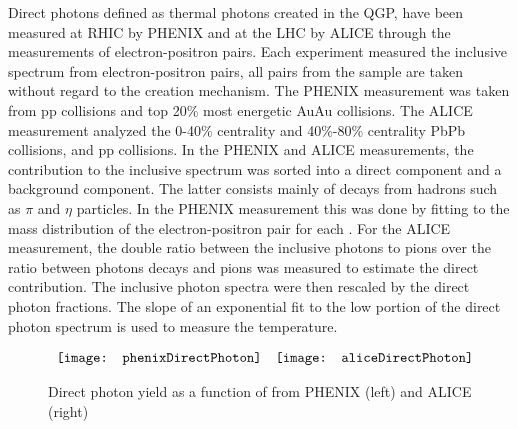     Direct photons defined as thermal photons created in the QGP, have been 
      measured at RHIC by PHENIX \cite{phenixPhoton2010} and at the LHC by ALICE 
      \cite{photonALICE} through the measurements of electron-positron pairs.
    Each experiment measured the inclusive \pt{} spectrum from 
      electron-positron pairs, all pairs from the sample are taken without
      regard to the creation mechanism.
    The PHENIX measurement was taken from pp collisions and top 20\% most 
      energetic AuAu collisions\DIFdelbegin {}\DIFdelend . 
    The ALICE measurement analyzed the 0-40\% centrality and 40\%-80\% centrality
      PbPb collisions, and pp collisions. 
    In the PHENIX and ALICE measurements, the contribution to the inclusive 
      spectrum was sorted into a direct component and a background component.
    The latter consists mainly of decays from hadrons such as $\pi$ and $\eta$
      particles. 
    In the PHENIX measurement this was done by fitting to the mass 
      distribution of the electron-positron pair for each \pt{} \DIFaddbegin {}\DIFaddend .
    For the ALICE measurement, the double ratio between the inclusive photons 
      to pions over the ratio between photons \DIFdelbegin {}\DIFdelend \DIFaddbegin {}\DIFaddend decays and pions 
      was measured to estimate the direct contribution.
    \DIFaddbegin {}\DIFaddend The inclusive photon \pt{} spectra were then rescaled by the direct 
      photon fractions.
    The slope of an exponential fit to the low \pt{} portion of the direct 
      photon spectrum is used to measure the temperature.
    \begin{figure}[!Hhbt]
      \centering
      $ \begin{array}{c c}
        \texttt{[image: phenixDirectPhoton]} &
        \texttt{[image: aliceDirectPhoton]}
      \end{array} $
      \caption{Direct photon yield as a function of \pt{} from 
        PHENIX \cite{phenixPhoton2010} (left) and ALICE \cite{photonALICE} 
        (right)}
      \label{fig:directPhotonPt}
    \end{figure}

